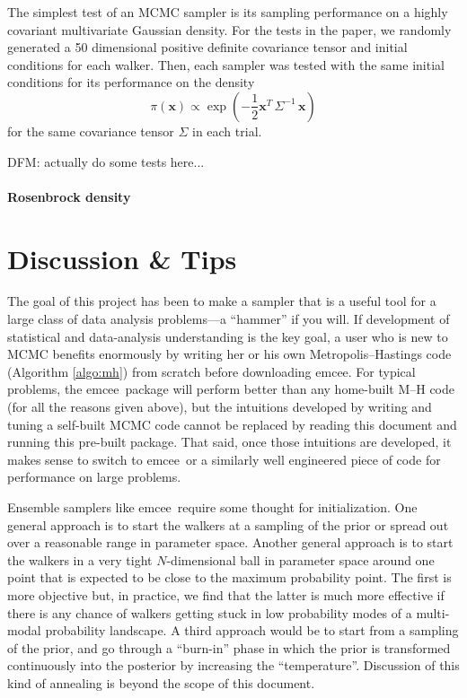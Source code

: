 \documentclass[12pt,preprint]{aastex}
\newcommand{\project}[1]{{\sffamily #1}}
\newcommand{\thisplain}{emcee}
\newcommand{\this}{\project{\thisplain}}
\newcommand{\algo}[1]{Algorithm \ref{algo:#1}}
\begin{document}
The simplest test of an MCMC sampler is its sampling performance on a highly
covariant multivariate Gaussian density. For the tests in the paper, we
randomly generated a 50 dimensional positive definite covariance tensor and
initial conditions for each walker. Then, each sampler was tested with the
same initial conditions for its performance on the density
\begin{equation}
    \pi (\mathbf{x}) \propto \exp\left ( -\frac{1}{2} \mathbf{x}^T \,
                                \Sigma^{-1} \, \mathbf{x} \right )
\end{equation}
for the same covariance tensor $\Sigma$ in each trial.

DFM: actually do some tests here...

\paragraph{Rosenbrock density}

\section{Discussion \& Tips}


The goal of this project has been to make a sampler that is a useful
tool for a large class of data analysis problems---a ``hammer'' if you
will.  If development of statistical and data-analysis understanding
is the key goal, a user who is new to MCMC benefits enormously by
writing her or his own Metropolis--Hastings code (\algo{mh}) from
scratch before downloading \this.  For typical problems, the
\this\ package will perform better than any home-built M--H code (for
all the reasons given above), but the intuitions developed by writing
and tuning a self-built MCMC code cannot be replaced by reading this
document and running this pre-built package.  That said, once those
intuitions are developed, it makes sense to switch to \this\ or a
similarly well engineered piece of code for performance on large
problems.

Ensemble samplers like \this\ require some thought for
initialization.  One general approach is to start the walkers at a
sampling of the prior or spread out over a reasonable range in
parameter space.  Another general approach is to start the walkers in
a very tight $N$-dimensional ball in parameter space around one point
that is expected to be close to the maximum probability point.  The
first is more objective but, in practice, we find that the latter is
much more effective if there is any chance of walkers getting stuck in
low probability modes of a multi-modal probability landscape.  A third
approach would be to start from a sampling of the prior, and go
through a ``burn-in'' phase in which the prior is transformed
continuously into the posterior by increasing the ``temperature''.
Discussion of this kind of annealing is beyond the scope of this
document.
\end{document}
